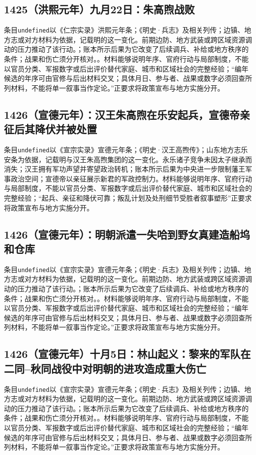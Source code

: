 \subsection{1425（洪熙元年）九月22日：朱高煦战败}
条目\texttt{undefined}以《仁宗实录》洪熙元年条；《明史·兵志》及相关列传；边镇、地方志或对方材料为依据，记载明的这一变化。前期边防、地方武装或跨区域资源调动的压力推动了该行动。；账本所示后果为它改变了后续调兵、补给或地方秩序的条件；战果和伤亡须分开核对。。材料能够说明年序、官府行动与局部制度，不能以官员分类、军报数字或后出评价替代家庭、城市和区域社会的完整经验；“编年候选的年序可由官修与后出材料交叉；具体月日、参与者、战果或数字必须回查所列材料，不能将单一叙事当作定论。”正要求将政策宣布与地方实施分开。

\subsection{1426（宣德元年）：汉王朱高煦在乐安起兵，宣德帝亲征后其降伏并被处置}
条目\texttt{undefined}以《宣宗实录》宣德元年条；《明史·汉王高煦传》；山东地方志乐安条为依据，记载明与汉王朱高煦集团的这一变化。永乐诸子竞争未因太子继承而消失；汉王拥有军功声望并寄望政治转机；账本所示后果为中央进一步限制藩王军事政治空间；宣德帝以亲征展示新君的军政控制力。材料能够说明年序、官府行动与局部制度，不能以官员分类、军报数字或后出评价替代家庭、城市和区域社会的完整经验；“起兵、亲征和降伏可靠；叛乱计划及处刑细节受胜者叙事塑形”正要求将政策宣布与地方实施分开。

\subsection{1426（宣德元年）：明朝派遣一失哈到野女真建造船坞和仓库}
条目\texttt{undefined}以《宣宗实录》宣德元年条；《明史·兵志》及相关列传；边镇、地方志或对方材料为依据，记载明的这一变化。前期边防、地方武装或跨区域资源调动的压力推动了该行动。；账本所示后果为它改变了后续调兵、补给或地方秩序的条件；战果和伤亡须分开核对。。材料能够说明年序、官府行动与局部制度，不能以官员分类、军报数字或后出评价替代家庭、城市和区域社会的完整经验；“编年候选的年序可由官修与后出材料交叉；具体月日、参与者、战果或数字必须回查所列材料，不能将单一叙事当作定论。”正要求将政策宣布与地方实施分开。

\subsection{1426（宣德元年）十月5日：林山起义：黎来的军队在二同–秋同战役中对明朝的进攻造成重大伤亡}
条目\texttt{undefined}以《宣宗实录》宣德元年条；《明史·兵志》及相关列传；边镇、地方志或对方材料为依据，记载明的这一变化。前期边防、地方武装或跨区域资源调动的压力推动了该行动。；账本所示后果为它改变了后续调兵、补给或地方秩序的条件；战果和伤亡须分开核对。。材料能够说明年序、官府行动与局部制度，不能以官员分类、军报数字或后出评价替代家庭、城市和区域社会的完整经验；“编年候选的年序可由官修与后出材料交叉；具体月日、参与者、战果或数字必须回查所列材料，不能将单一叙事当作定论。”正要求将政策宣布与地方实施分开。

